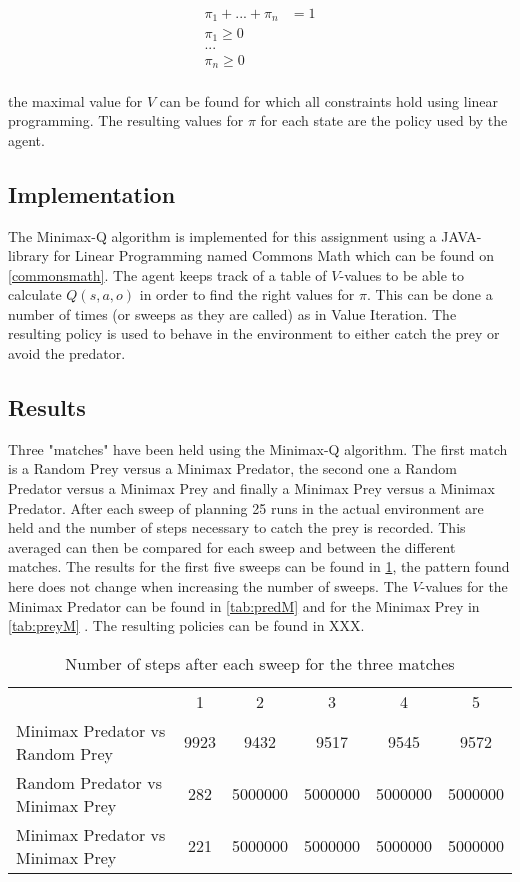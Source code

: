 \begin{align*}
\pi_1 + ... + \pi_n &= 1\\
\pi_1 \geq 0\\
...\\
\pi_n  \geq 0\\
\end{align*}

the maximal value for $V$ can be found for which all constraints hold using linear programming. The resulting values for $\pi$ for each state are the policy used by the agent.

\subsection{Implementation}
The Minimax-Q algorithm is implemented for this assignment using a JAVA-library for Linear Programming named Commons Math which can be found on \ref{commonsmath}. The agent keeps track of a table of $V$-values to be able to calculate $Q(s,a,o)$ in order to find the right values for $\pi$. This can be done a number of times (or sweeps as they are called) as in Value Iteration. The resulting policy is used to behave in the environment to either catch the prey or avoid the predator.

\subsection{Results}
Three "matches" have been held using the Minimax-Q algorithm. The first match is a Random Prey versus a Minimax Predator, the second one a Random Predator versus a Minimax Prey and finally a Minimax Prey versus a Minimax Predator. After each sweep of planning 25 runs in the actual environment are held and the number of steps necessary to catch the prey is recorded. This averaged can then be compared for each sweep and between the different matches. The results for the first five sweeps can be found in \ref{tab:minimaxTable}, the pattern found here does not change when increasing the number of sweeps. The $V$-values for the Minimax Predator can be found in \ref{tab:predM} and for the Minimax Prey in \ref{tab:preyM} .  The resulting policies can be found in XXX.\\

\begin{table}[htb]
\centering
\begin{tabular}{lccccc}
&1&2&3&4&5\\
Minimax Predator vs Random Prey & 9923 & 9432&9517&9545&9572\\
Random Predator vs Minimax Prey & 282& 5000000& 5000000& 5000000& 5000000\\
Minimax Predator vs Minimax Prey & 221& 5000000& 5000000& 5000000& 5000000\\
\end{tabular}
\caption{Number of steps after each sweep for the three matches}
\label{tab:minimaxTable}
\end{table}

